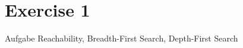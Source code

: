 
\section{Exercise 1}

\setcounter{exercise}{1}

\begin{frame}[allowframebreaks]{Aufgabe \thesection}{Reachability, Breadth-First Search, Depth-First Search}
  \begin{solutionnoinc}
    \centering
  \end{solutionnoinc}
  \begin{solution}
    \centering
  \end{solution}
  \begin{solutionnoinc}
    \centering
  \end{solutionnoinc}
  \begin{solutionnoinc}
    \centering
  \end{solutionnoinc}
\end{frame}


